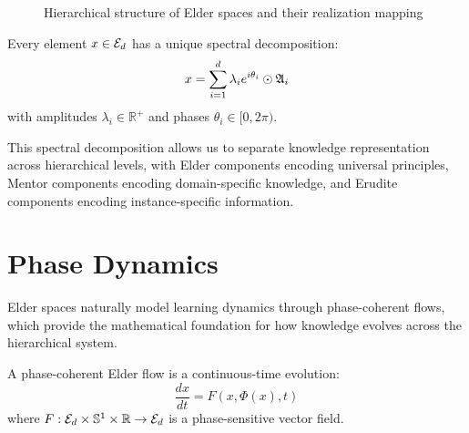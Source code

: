 \begin{figure}[htbp]
\centering
{}
\caption{Hierarchical structure of Elder spaces and their realization mapping}
\label{fig:hierarchical-elder-structure}
\end{figure}

\begin{theorem}
Every element $x \in \mathcal{E}_{d}$ has a unique spectral decomposition:
\begin{equation}
x = \sum_{i=1}^{d} \lambda_i e^{i\theta_i} \odot \mathfrak{A}_{i}
\end{equation}
with amplitudes $\lambda_i \in \mathbb{R}^+$ and phases $\theta_i \in [0, 2\pi)$.
\end{theorem}

This spectral decomposition allows us to separate knowledge representation across hierarchical levels, with Elder components encoding universal principles, Mentor components encoding domain-specific knowledge, and Erudite components encoding instance-specific information.

\section{Phase Dynamics}

Elder spaces naturally model learning dynamics through phase-coherent flows, which provide the mathematical foundation for how knowledge evolves across the hierarchical system.

\begin{definition}
A phase-coherent Elder flow is a continuous-time evolution:
\begin{equation}
\frac{dx}{dt} = F(x, \Phi(x), t)
\end{equation}
where $F: \mathcal{E}_{d} \times \mathbb{S}^1 \times \mathbb{R} \rightarrow \mathcal{E}_{d}$ is a phase-sensitive vector field.
\end{definition}

